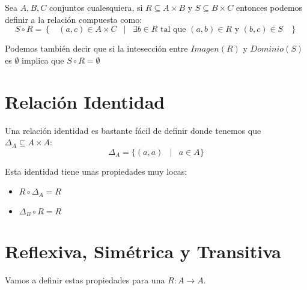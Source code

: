 \documentclass[12pt, fleqn]{report}                             %
\DeclareMathOperator \Space {\quad}                             %
\DeclareMathOperator \MiniSpace {\;}                            %
\newcommand \Such {\MiniSpace|\MiniSpace}                       %
\newcommand{\Set}[1]{\left\{ \MiniSpace #1 \MiniSpace \right\}} %
\begin{document}
            Sea $A, B, C$ conjuntos cualesquiera, si $R \subseteq A \times B$ 
            y $S \subseteq B \times C$ entonces podemos definir a la relación
            compuesta como:            
            \begin{equation}
                S \circ R = \Set{ (a,c) \in A \times C \Such
                        \exists b \in R \text{ tal que } 
                            (a,b) \in R \text{ y } (b, c) \in S
                    }
            \end{equation}


            Podemos también decir que si la intesección entre $Imagen(R)$ y
            $Dominio(S)$ es $\emptyset$ implica que $S \circ R = \emptyset$


        \section{Relación Identidad}

            Una relación identidad es bastante fácil de definir donde tenemos
            que $\Delta_{A} \subseteq A \times A$:
            \begin{equation}
                \Delta_{A} = \{ (a, a) \Such a \in A \}
            \end{equation}

            Esta identidad tiene unas propiedades muy locas:
            \begin{itemize}
                \item $R \circ \Delta_{A} = R$
                \item $\Delta_{B} \circ R = R$
            \end{itemize}







        \clearpage
        \section{Reflexiva, Simétrica y Transitiva}

            Vamos a definir estas propiedades para una $R: A \to A$.
                
\end{document}
